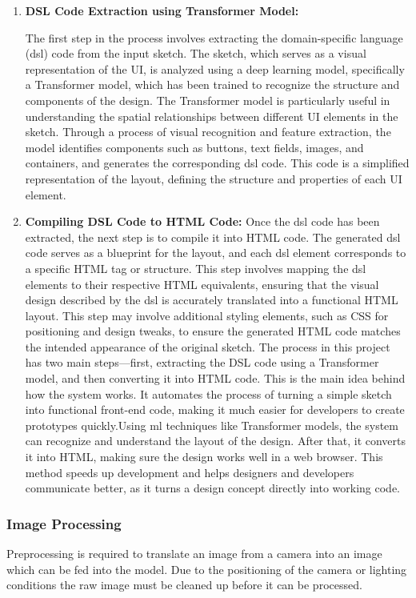     \begin{enumerate}
        \item \textbf{DSL Code Extraction using Transformer Model:}
        
        The first step in the process involves extracting the domain-specific language (\gls{dsl}) code from the input sketch. The sketch, which serves as a visual representation of the UI, is analyzed using a deep learning model, specifically a Transformer model, which has been trained to recognize the structure and components of the design. The Transformer model is particularly useful in understanding the spatial relationships between different UI elements in the sketch. Through a process of visual recognition and feature extraction, the model identifies components such as buttons, text fields, images, and containers, and generates the corresponding \gls{dsl} code. This code is a simplified representation of the layout, defining the structure and properties of each UI element.

        \item \textbf{Compiling DSL Code to HTML Code:}
        Once the \gls{dsl} code has been extracted, the next step is to compile it into HTML code. The generated \gls{dsl} code serves as a blueprint for the layout, and each \gls{dsl} element corresponds to a specific HTML tag or structure. This step involves mapping the \gls{dsl} elements to their respective HTML equivalents, ensuring that the visual design described by the \gls{dsl} is accurately translated into a functional HTML layout. This step may involve additional styling elements, such as CSS for positioning and design tweaks, to ensure the generated HTML code matches the intended appearance of the original sketch. 
        The process in this project has two main steps—first, extracting the DSL code using a Transformer model, and then converting it into HTML code. This is the main idea behind how the system works. It automates the process of turning a simple sketch into functional front-end code, making it much easier for developers to create prototypes quickly.Using \gls{ml} techniques like Transformer models, the system can recognize and understand the layout of the design. After that, it converts it into HTML, making sure the design works well in a web browser. This method speeds up development and helps designers and developers communicate better, as it turns a design concept directly into working code.
    \end{enumerate}
\subsubsection{Image Processing}
Preprocessing is required to translate an image from a camera into an image which can
be fed into the model. Due to the positioning of the camera or lighting conditions the
raw image must be cleaned up before it can be processed.


